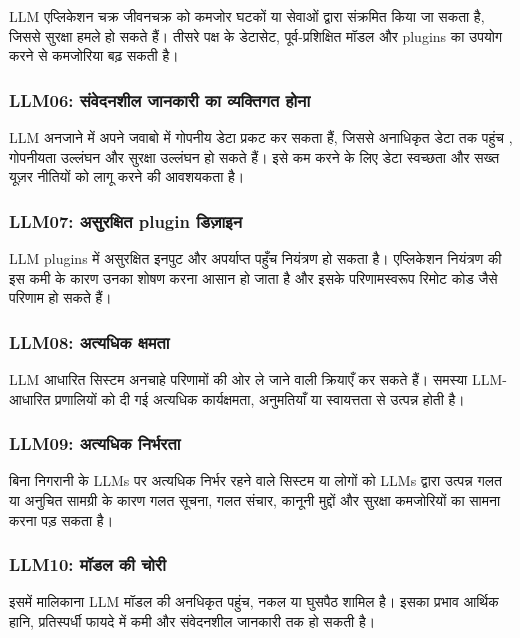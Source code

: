 \documentclass[
]{article}
\begin{document}
LLM एप्लिकेशन चक्र जीवनचक्र को कमजोर घटकों या सेवाओं द्वारा संक्रमित किया जा सकता
है, जिससे सुरक्षा हमले हो सकते हैं। तीसरे पक्ष के डेटासेट, पूर्व-प्रशिक्षित मॉडल और
plugins का उपयोग करने से कमजोरिया बढ़ सकती है।

\subsubsection{LLM06: संवेदनशील जानकारी का व्यक्तिगत
होना}\label{llm06-ux938ux935ux926ux928ux936ux932-ux91cux928ux915ux930-ux915-ux935ux92fux915ux924ux917ux924-ux939ux928}

LLM अनजाने में अपने जवाबो में गोपनीय डेटा प्रकट कर सकता हैं, जिससे अनाधिकृत डेटा तक
पहुंच , गोपनीयता उल्लंघन और सुरक्षा उल्लंघन हो सकते हैं। इसे कम करने के लिए डेटा स्वच्छता
और सख्त यूज़र नीतियों को लागू करने की आवशयकता है।

\subsubsection{LLM07: असुरक्षित plugin
डिज़ाइन}\label{llm07-ux905ux938ux930ux915ux937ux924-plugin-ux921ux91cux907ux928}

LLM plugins में असुरक्षित इनपुट और अपर्याप्त पहुँच नियंत्रण हो सकता है। एप्लिकेशन
नियंत्रण की इस कमी के कारण उनका शोषण करना आसान हो जाता है और इसके परिणामस्वरूप
रिमोट कोड जैसे परिणाम हो सकते हैं।

\subsubsection{LLM08: अत्यधिक
क्षमता}\label{llm08-ux905ux924ux92fux927ux915-ux915ux937ux92eux924}

LLM आधारित सिस्टम अनचाहे परिणामों की ओर ले जाने वाली क्रियाएँ कर सकते हैं। समस्या
LLM-आधारित प्रणालियों को दी गई अत्यधिक कार्यक्षमता, अनुमतियाँ या स्वायत्तता से
उत्पन्न होती है।

\subsubsection{LLM09: अत्यधिक
निर्भरता}\label{llm09-ux905ux924ux92fux927ux915-ux928ux930ux92dux930ux924}

बिना निगरानी के LLMs पर अत्यधिक निर्भर रहने वाले सिस्टम या लोगों को LLMs द्वारा
उत्पन्न गलत या अनुचित सामग्री के कारण गलत सूचना, गलत संचार, कानूनी मुद्दों और सुरक्षा
कमजोरियों का सामना करना पड़ सकता है।

\subsubsection{LLM10: मॉडल की
चोरी}\label{llm10-ux92eux921ux932-ux915-ux91aux930}

इसमें मालिकाना LLM मॉडल की अनधिकृत पहुंच, नकल या घुसपैठ शामिल है। इसका प्रभाव
आर्थिक हानि, प्रतिस्पर्धी फायदे में कमी और संवेदनशील जानकारी तक हो सकती है।
\end{document}
